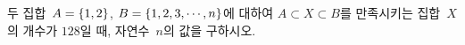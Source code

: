 두 집합~$A=\{1{,}\mkern3mu\mathopen{}2\}$, $B=\{1{,}\mkern3mu\mathopen{}2{,}\mkern3mu\mathopen{}3{,}\mkern3mu\mathopen{}\cdots{,}\mkern3mu\mathopen{}n\}$에 대하여 $A\subset X\subset B$를 만족시키는 집합~$X$의 개수가 $128$일 때, 자연수~$n$의 값을 구하시오.
